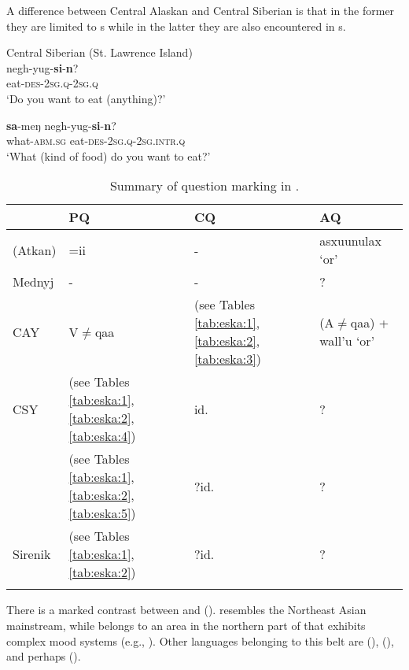 A difference between Central Alaskan  and Central Siberian  is that in the former they are limited to s while in the latter they are also encountered in s.

\ea%
    \label{ex:eska:12}
    Central Siberian  (St. Lawrence Island)\\
    \ea
    \gll negh-yug-\textbf{{si}}-\textbf{{n}}?\\
    eat-\textsc{des}-2\textsc{sg.q}-2\textsc{sg.q}\\
    \glt ‘Do you want to eat (anything)?’
    
    \ex
    \gll \textbf{{sa}}-meŋ    negh-yug-\textbf{{si}}{-}\textbf{{n}}?\\
    what-\textsc{abm.sg}  eat-\textsc{des}-2\textsc{sg.q}-2\textsc{sg.intr.q}\\
    \glt ‘What (kind of food) do you want to eat?’\citep[60]{Jacobson1979}
    \z
    \z

\begin{table}
\caption{Summary of question marking in .}
\label{tab:eska:6}
\small
\begin{tabularx}{\textwidth}{lQQl}
\lsptoprule
& \textbf{PQ} & \textbf{CQ} & \textbf{AQ}\\
\midrule
{} (Atkan) & =ii & - & asxuunulax ‘or’\\
Mednyj  & - & - & ?\\
CAY & V${\neq}$qaa & (see Tables \ref{tab:eska:1}, \ref{tab:eska:2}, \ref{tab:eska:3}) & (A${\neq}$qaa) + wall’u ‘or’\\
CSY & (see Tables \ref{tab:eska:1}, \ref{tab:eska:2}, \ref{tab:eska:4}) & id. & ?\\
 & (see Tables \ref{tab:eska:1}, \ref{tab:eska:2}, \ref{tab:eska:5}) & ?id. & ?\\
Sirenik & (see Tables \ref{tab:eska:1}, \ref{tab:eska:2}) & ?id. & ?\\
\lspbottomrule
\end{tabularx}
\end{table}

There is a marked contrast between  and   ().  resembles the Northeast Asian mainstream, while  belongs to an area in the northern part of  that exhibits complex  mood systems (e.g., \citealt{Audova1997}). Other languages belonging to this belt are  (),  (), and perhaps  ().

